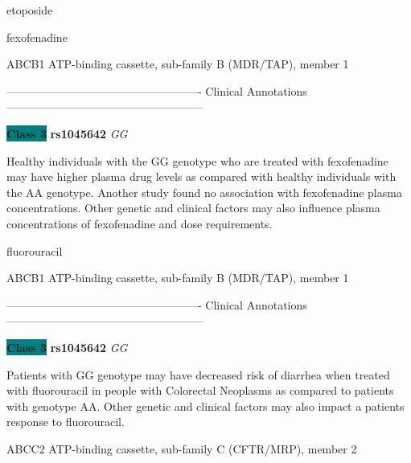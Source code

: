 \documentclass{resume} %
\begin{document}
\begin{rSection}{ etoposide }
\end{rSection}\begin{rSection}{ fexofenadine }
\item[]

\begin{rSubsection}{ ABCB1 }{ ATP-binding cassette, sub-family B (MDR/TAP), member 1 }{}{}
\item[]

\item[] ---------------------------------------------------- Clinical Annotations -----------------------------------------------------\newline
\item \textbf{\colorbox{teal} {Class 3}} \textbf{ rs1045642 } \textit{ GG }
\item[] Healthy individuals with the GG genotype who are treated with fexofenadine may have higher plasma drug levels as compared with healthy individuals with the AA genotype. Another study found no association with fexofenadine plasma concentrations. Other genetic and clinical factors may also influence plasma concentrations of fexofenadine and dose requirements.
\end{rSubsection}

\end{rSection}\begin{rSection}{ fluorouracil }
\item[]

\begin{rSubsection}{ ABCB1 }{ ATP-binding cassette, sub-family B (MDR/TAP), member 1 }{}{}
\item[]

\item[] ---------------------------------------------------- Clinical Annotations -----------------------------------------------------\newline
\item \textbf{\colorbox{teal} {Class 3}} \textbf{ rs1045642 } \textit{ GG }
\item[] Patients with GG genotype may have decreased risk of diarrhea when treated with fluorouracil in people with Colorectal Neoplasms as compared to patients with genotype AA. Other genetic and clinical factors may also impact a patients response to fluorouracil.
\end{rSubsection}\begin{rSubsection}{ ABCC2 }{ ATP-binding cassette, sub-family C (CFTR/MRP), member 2 }{}{}
\item[]


\end{rSubsection}
\end{rSection}
\end{document}
